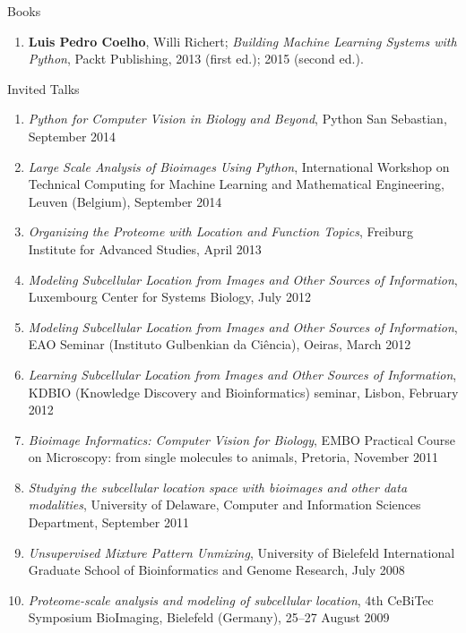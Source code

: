 \documentclass{article}
\renewcommand\subsection[1]{%
    \par\vspace{.1em}%
    {\hspace{1em}\subsubhead #1}%
    \par\vspace{.2em}%
}
\begin{document}
\subsection{Books}
\begin{enumerate}
\item \textbf{Luis Pedro Coelho}, Willi Richert; \emph{Building Machine
Learning Systems with Python}, Packt Publishing, 2013 (first ed.); 2015
(second ed.).
\end{enumerate}

\subsection{Invited Talks}
\begin{enumerate}
\item \emph{Python for Computer Vision in Biology and Beyond}, Python San
    Sebastian, September 2014
\item \emph{Large Scale Analysis of Bioimages Using Python}, International
    Workshop on Technical Computing for Machine Learning and Mathematical
    Engineering, Leuven (Belgium), September 2014
\item \emph{Organizing the Proteome with Location and Function Topics},
Freiburg Institute for Advanced Studies, April 2013
\item \emph{Modeling Subcellular Location from Images and Other Sources of
Information}, Luxembourg Center for Systems Biology, July 2012
\item \emph{Modeling Subcellular Location from Images and Other Sources of
Information}, EAO Seminar (Instituto Gulbenkian da Ciência), Oeiras, March 2012
\item \emph{Learning Subcellular Location from Images and Other Sources of
Information}, KDBIO (Knowledge Discovery and Bioinformatics) seminar, Lisbon,
February 2012
\item \emph{Bioimage Informatics: Computer Vision for Biology}, EMBO Practical
Course on Microscopy: from single molecules to animals, Pretoria, November 2011
\item \emph{Studying the subcellular location space with bioimages and other
data modalities}, University of Delaware, Computer and Information Sciences
Department, September 2011
\item \emph{Unsupervised Mixture Pattern Unmixing}, University of Bielefeld
International Graduate School of Bioinformatics and Genome Research, July 2008
\item \emph{Proteome-scale analysis and modeling of subcellular location}, 4th
CeBiTec Symposium BioImaging, Bielefeld (Germany), 25--27 August 2009
\end{enumerate}
\end{document}
